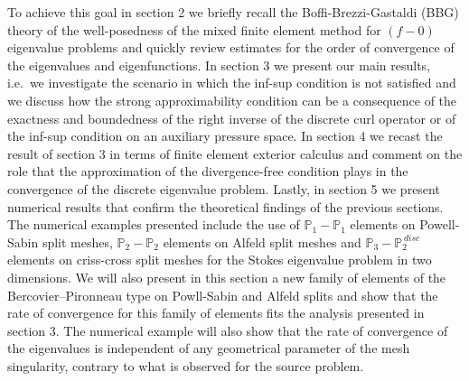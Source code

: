 \documentclass[USenglish]{article}
\theoremstyle{dgthm}
\theoremstyle{dgdef}
\begin{document}
To achieve this goal in section 2 we briefly recall the Boffi-Brezzi-Gastaldi (BBG) theory of the well-posedness of the mixed finite element method for $(f\!-\!0)$ eigenvalue problems and quickly review estimates for the order of convergence of the eigenvalues and eigenfunctions.
In section 3 we present our main results, i.e.~we investigate the scenario in which the inf-sup condition is not satisfied and we discuss how the strong approximability condition can be a consequence of the exactness and boundedness of the right inverse of the discrete curl operator or of the inf-sup condition on an auxiliary pressure space.
In section 4 we recast the result of section 3 in terms of finite element exterior calculus and comment on the role that the approximation of the divergence-free condition plays in the convergence of the discrete eigenvalue problem.
Lastly, in section 5 we present numerical results that confirm the theoretical findings of the previous sections.
The numerical examples presented include the use of $\mathbb{P}_1-\mathbb{P}_1$ elements on Powell-Sabin split meshes, $\mathbb{P}_2-\mathbb{P}_2$ elements on Alfeld split meshes and $\mathbb{P}_3-\mathbb{P}_2^{\,disc}$ elements on criss-cross split meshes for the Stokes eigenvalue problem in two dimensions.
We will also present in this section a new family of elements of the Bercovier--Pironneau type on Powll-Sabin and Alfeld splits and show that the rate of convergence for this family of elements fits the analysis presented in section 3.
The numerical example will also show that the rate of convergence of the eigenvalues is independent of any geometrical parameter of the mesh singularity, contrary to what is observed for the source problem.
\end{document}
